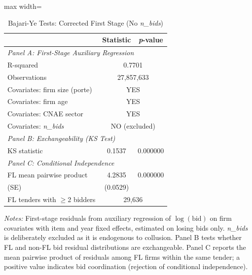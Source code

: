 \begin{table}[htbp]
\centering
\caption{Bajari-Ye Tests: Corrected First Stage (No \textit{n\_bids})}
\label{tab:bajari_ye_corrected}
\begin{adjustbox}{max width=\textwidth}
\begin{threeparttable}
\small
\begin{tabular}{lcc}
\toprule
 & Statistic & \textit{p}-value \\
\midrule
\multicolumn{3}{l}{\textit{Panel A: First-Stage Auxiliary Regression}} \\[3pt]
R-squared & \multicolumn{2}{c}{0.7701} \\
Observations & \multicolumn{2}{c}{27,857,633} \\
Covariates: firm size (porte) & \multicolumn{2}{c}{YES} \\
Covariates: firm age & \multicolumn{2}{c}{YES} \\
Covariates: CNAE sector & \multicolumn{2}{c}{YES} \\
Covariates: \textit{n\_bids} & \multicolumn{2}{c}{NO (excluded)} \\
\midrule
\multicolumn{3}{l}{\textit{Panel B: Exchangeability (KS Test)}} \\[3pt]
KS statistic & 0.1537 & 0.000000 \\
\midrule
\multicolumn{3}{l}{\textit{Panel C: Conditional Independence}} \\[3pt]
FL mean pairwise product & 4.2835 & 0.000000 \\
\quad (SE) & (0.0529) & \\
FL tenders with $\geq$2 bidders & \multicolumn{2}{c}{29,636} \\
\bottomrule
\end{tabular}
\begin{tablenotes}
\small
\item \textit{Notes:} First-stage residuals from auxiliary regression of
$\log(\text{bid})$ on firm covariates with item and year fixed effects,
estimated on losing bids only. \textit{n\_bids} is deliberately excluded
as it is endogenous to collusion. Panel B tests whether FL and non-FL bid
residual distributions are exchangeable. Panel C reports the mean pairwise
product of residuals among FL firms within the same tender; a positive value
indicates bid coordination (rejection of conditional independence).
\end{tablenotes}
\end{threeparttable}
\end{adjustbox}
\end{table}
